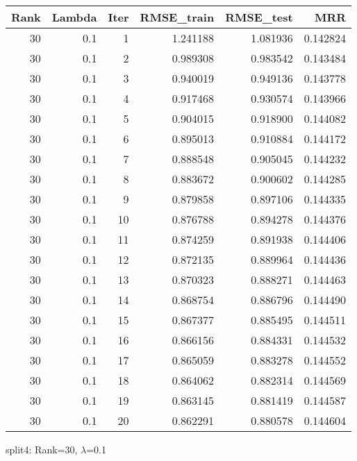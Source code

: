 \begin{tabular}{rrrrrr}
\toprule
 Rank &  Lambda &  Iter &  RMSE\_train &  RMSE\_test &       MRR \\
\midrule
   30 &     0.1 &     1 &    1.241188 &   1.081936 &  0.142824 \\
   30 &     0.1 &     2 &    0.989308 &   0.983542 &  0.143484 \\
   30 &     0.1 &     3 &    0.940019 &   0.949136 &  0.143778 \\
   30 &     0.1 &     4 &    0.917468 &   0.930574 &  0.143966 \\
   30 &     0.1 &     5 &    0.904015 &   0.918900 &  0.144082 \\
   30 &     0.1 &     6 &    0.895013 &   0.910884 &  0.144172 \\
   30 &     0.1 &     7 &    0.888548 &   0.905045 &  0.144232 \\
   30 &     0.1 &     8 &    0.883672 &   0.900602 &  0.144285 \\
   30 &     0.1 &     9 &    0.879858 &   0.897106 &  0.144335 \\
   30 &     0.1 &    10 &    0.876788 &   0.894278 &  0.144376 \\
   30 &     0.1 &    11 &    0.874259 &   0.891938 &  0.144406 \\
   30 &     0.1 &    12 &    0.872135 &   0.889964 &  0.144436 \\
   30 &     0.1 &    13 &    0.870323 &   0.888271 &  0.144463 \\
   30 &     0.1 &    14 &    0.868754 &   0.886796 &  0.144490 \\
   30 &     0.1 &    15 &    0.867377 &   0.885495 &  0.144511 \\
   30 &     0.1 &    16 &    0.866156 &   0.884331 &  0.144532 \\
   30 &     0.1 &    17 &    0.865059 &   0.883278 &  0.144552 \\
   30 &     0.1 &    18 &    0.864062 &   0.882314 &  0.144569 \\
   30 &     0.1 &    19 &    0.863145 &   0.881419 &  0.144587 \\
   30 &     0.1 &    20 &    0.862291 &   0.880578 &  0.144604 \\
\bottomrule
\end{tabular}

\caption{split4: Rank=30, $\lambda$=0.1}
